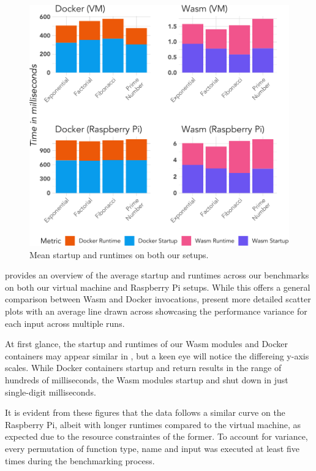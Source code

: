\documentclass[
  table]{report}
\begin{document}
\begin{figure}[H]

{\centering \includegraphics{thesis_files/figure-latex/avg-efficiency-nrec-rpi-1} 

}

\caption{Mean startup and runtimes on both our setups.}\label{fig:avg-efficiency-nrec-rpi}
\end{figure}

 provides an overview of the average
startup and runtimes across our benchmarks on both our virtual machine
and Raspberry Pi setups. While this offers a general comparison between
\ac{Wasm} and Docker invocations,
 present more detailed
scatter plots with an average line drawn across showcasing the
performance variance for each input across multiple runs.

At first glance, the startup and runtimes of our \ac{Wasm} modules and
Docker containers may appear similar in
, but a keen eye will notice the
differeing y-axis scales. While Docker containers startup and return
results in the range of hundreds of milliseconds, the \ac{Wasm} modules
startup and shut down in just single-digit milliseconds.

It is evident from these figures that the data follows a similar curve
on the Raspberry Pi, albeit with longer runtimes compared to the virtual
machine, as expected due to the resource constraintes of the former. To
account for variance, every permutation of function type, name and input
was executed at least five times during the benchmarking process.
\end{document}
